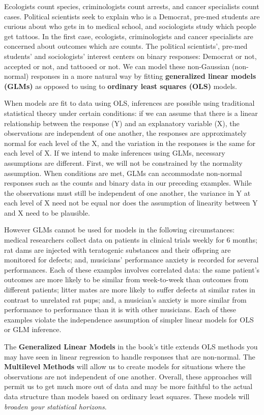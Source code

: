 \documentclass[
]{krantz}
\begin{document}
Ecologists count species, criminologists count arrests, and cancer specialists count cases. Political scientists seek to explain who is a Democrat, pre-med students are curious about who gets in to medical school, and sociologists study which people get tattoos. In the first case, ecologists, criminologists and cancer specialists are concerned about outcomes which are counts. The political scientists', pre-med students' and sociologists' interest centers on binary responses: Democrat or not, accepted or not, and tattooed or not. We can model these non-Gaussian (non-normal) responses in a more natural way by fitting \textbf{generalized linear models (GLMs)} as opposed to using to \textbf{ordinary least squares (OLS)} models.

When models are fit to data using OLS, inferences are possible using traditional statistical theory under certain conditions: if we can assume that there is a linear relationship between the response (Y) and an explanatory variable (X), the observations are independent of one another, the responses are approximately normal for each level of the X, and the variation in the responses is the same for each level of X. If we intend to make inferences using GLMs, necessary assumptions are different. First, we will not be constrained by the normality assumption. When conditions are met, GLMs can accommodate non-normal responses such as the counts and binary data in our preceding examples. While the observations must still be independent of one another, the variance in Y at each level of X need not be equal nor does the assumption of linearity between Y and X need to be plausible.

However GLMs cannot be used for models in the following circumstances: medical researchers collect data on patients in clinical trials weekly for 6 months; rat dams are injected with teratogenic substances and their offspring are monitored for defects; and, musicians' performance anxiety is recorded for several performances. Each of these examples involves correlated data: the same patient's outcomes are more likely to be similar from week-to-week than outcomes from different patients; litter mates are more likely to suffer defects at similar rates in contrast to unrelated rat pups; and, a musician's anxiety is more similar from performance to performance than it is with other musicians. Each of these examples violate the independence assumption of simpler linear models for OLS or GLM inference.

The \textbf{Generalized Linear Models} in the book's title extends OLS methods you may have seen in linear regression to handle responses that are non-normal. The \textbf{Multilevel Methods} will allow us to create models for situations where the observations are not independent of one another. Overall, these approaches will permit us to get much more out of data and may be more faithful to the actual data structure than models based on ordinary least squares. These models will \emph{broaden your statistical horizons}.
\end{document}
